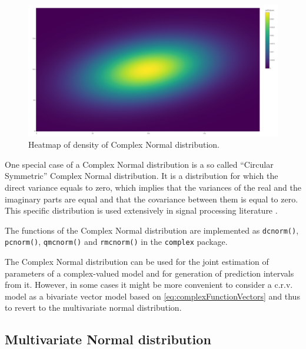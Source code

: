 \documentclass[
]{book}
\begin{document}
\begin{figure}
\centering
\includegraphics{./images/plotlyCNormalHeatmap.png}
\caption{\label{fig:plotlyCNormalHeatmap}Heatmap of density of Complex Normal distribution.}
\end{figure}

One special case of a Complex Normal distribution is a so called ``Circular Symmetric'' Complex Normal distribution. It is a distribution for which the direct variance equals to zero, which implies that the variances of the real and the imaginary parts are equal and that the covariance between them is equal to zero. This specific distribution is used extensively in signal processing literature \citep{referenceHere}.

The functions of the Complex Normal distribution are implemented as \texttt{dcnorm()}, \texttt{pcnorm()}, \texttt{qmcnorm()} and \texttt{rmcnorm()} in the \texttt{complex} package.

The Complex Normal distribution can be used for the joint estimation of parameters of a complex-valued model and for generation of prediction intervals from it. However, in some cases it might be more convenient to consider a c.r.v. model as a bivariate vector model based on \eqref{eq:complexFunctionVectors} and thus to revert to the multivariate normal distribution.

\hypertarget{MVNorm}{%
\subsection{Multivariate Normal distribution}\label{MVNorm}}
\end{document}
